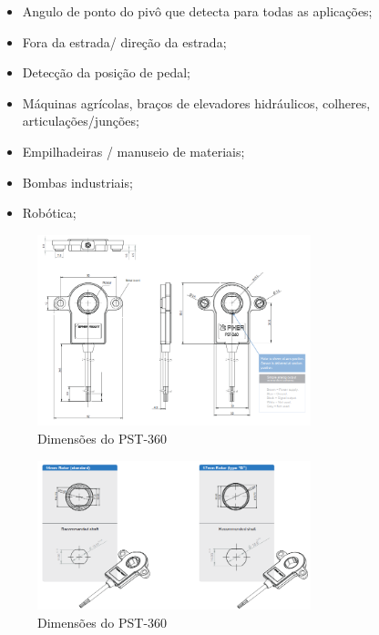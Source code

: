 
\begin{itemize}
  \item  Angulo de ponto do pivô que detecta para todas as aplicações;
  \item Fora da estrada/ direção da estrada;
  \item Detecção da posição de pedal;

  \item Máquinas agrícolas, braços de elevadores hidráulicos, colheres, articulações/junções;

  \item Empilhadeiras / manuseio de materiais;

  \item Bombas industriais;

  \item Robótica;

\end{itemize}


\begin{figure}[h]
  \centering
  \includegraphics[width=300px, scale=1]{figuras/pst_dimensoes}
  \caption{ Dimensões do PST-360 \cite{sensor_rotacao}}
\label{fig:pst_dimensoes}
\end{figure}

\begin{figure}[h]
  \centering
  \includegraphics[width=300px, scale=1]{figuras/pst_dimensoes2}
  \caption{ Dimensões do PST-360 \cite{sensor_rotacao}}
\label{fig:pst_dimensoes2}
\end{figure}

